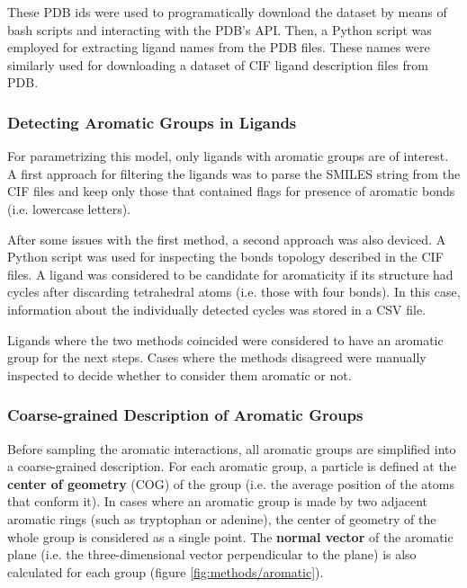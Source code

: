       These PDB ids were used to programatically download the dataset by means of bash scripts and interacting with the PDB's API. Then, a Python script was employed for extracting ligand names from the PDB files. These names were similarly used for downloading a dataset of CIF ligand description files from PDB.

    \subsubsection{Detecting Aromatic Groups in Ligands}
      For parametrizing this model, only ligands with aromatic groups are of interest. A first approach for filtering the ligands was to parse the SMILES string from the CIF files and keep only those that contained flags for presence of aromatic bonds (i.e. lowercase letters).

      After some issues with the first method, a second approach was also deviced. A Python script was used for inspecting the bonds topology described in the CIF files. A ligand was considered to be candidate for aromaticity if its structure had cycles after discarding tetrahedral atoms (i.e. those with four bonds). In this case, information about the individually detected cycles was stored in a CSV file.

      Ligands where the two methods coincided were considered to have an aromatic group for the next steps. Cases where the methods disagreed were manually inspected to decide whether to consider them aromatic or not.

    \subsubsection{Coarse-grained Description of Aromatic Groups}
      Before sampling the aromatic interactions, all aromatic groups are simplified into a coarse-grained description. For each aromatic group, a particle is defined at the \textbf{center of geometry} (COG) of the group (i.e. the average position of the atoms that conform it). In cases where an aromatic group is made by two adjacent aromatic rings (such as tryptophan or adenine), the center of geometry of the whole group is considered as a single point. The \textbf{normal vector} of the aromatic plane (i.e. the three-dimensional vector perpendicular to the plane) is also calculated for each group (figure \ref{fig:methods/aromatic}).

